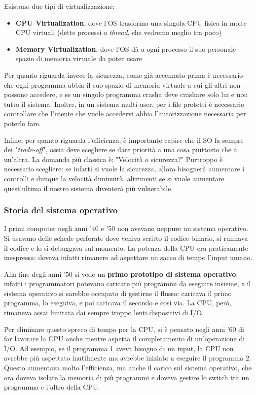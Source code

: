 \documentclass[11pt, a4paper, titlepage, oneside]{scrbook}
\begin{document}
Esistono due tipi di virtualizzazione:
\begin{itemize}
    \item \textbf{CPU Virtualization}, dove l'OS trasforma una singola CPU fisica in molte CPU virtuali (dette processi o \textit{thread}, che vedremo meglio tra poco)
    \item \textbf{Memory Virtualization}, dove l'OS dà a ogni processo il suo personale spazio di memoria virtuale da poter usare
\end{itemize}

Per quanto riguarda invece la sicurezza, come già accennato prima è necessario che ogni programma abbia il suo spazio di memoria virtuale a cui gli altri non possono accedere, e se un singolo programma crasha deve crashare solo lui e non tutto il sistema. Inoltre, in un sistema multi-user, per i file protetti è necessario controllare che l'utente che vuole accedervi abbia l'autorizzazione necessaria per poterlo fare.

Infine, per quanto riguarda l'efficienza, è importante capire che il SO fa sempre dei "\textit{trade-off}", ossia deve scegliere se dare priorità a una cosa piuttosto che a un'altra. La domanda più classica è: "Velocità o sicurezza?" Purtroppo è necessario scegliere: se infatti si vuole la sicurezza, allora bisognerà aumentare i controlli e dunque la velocità diminuirà, altrimenti se si vuole aumentare quest'ultima il nostro sistema diventerà più vulnerabile.

\subsubsection*{Storia del sistema operativo}

I primi computer negli anni '40 e '50 non avevano neppure un sistema operativo. Si usavano delle schede perforate dove veniva scritto il codice binario, si runnava il codice e lo si debuggava sul momento. La potenza della CPU era praticamente inespressa: doveva infatti rimanere ad aspettare un sacco di tempo l'input umano.

Alla fine degli anni '50 si vede un \textbf{primo prototipo di sistema operativo}: infatti i programmatori potevano caricare più programmi da eseguire insieme, e il sistema operativo si sarebbe occupato di gestirne il flusso: caricava il primo programma, lo eseguiva, e poi caricava il secondo e così via. La CPU, però, rimaneva assai limitata dai sempre troppo lenti dispositivi di I/O.

Per eliminare questo spreco di tempo per la CPU, si è pensato negli anni '60 di far lavorare la CPU anche mentre aspetta il completamento di un'operazione di I/O. Ad esempio, se il programma 1 aveva bisogno di un input, la CPU non avrebbe più aspettato inutilmente ma avrebbe iniziato a eseguire il programma 2. Questo aumentava molto l'efficienza, ma anche il carico sul sistema operativo, che ora doveva isolare la memoria di più programmi e doveva gestire lo switch tra un programma e l'altro della CPU.
\end{document}
